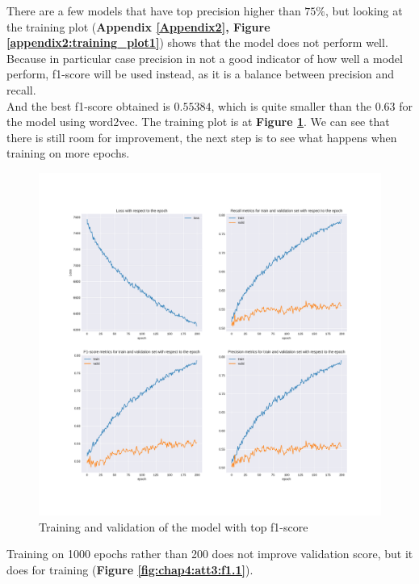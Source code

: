 There are a few models that have top precision higher than $75\%$, but looking at the training plot (\textbf{Appendix \ref{Appendix2}, Figure \ref{appendix2:training_plot1}}) shows that the model does not perform well. Because in particular case precision in not a good indicator of how well a model perform, f1-score will be used instead, as it is a balance between precision and recall. \\
And the best f1-score obtained is $0.55384$, which is quite smaller than the $0.63$ for the model using word2vec. The training plot is at \textbf{Figure \ref{fig:chap4:att3:f1}}. We can see that there is still room for improvement, the next step is to see what happens when training on more epochs. \\

\begin{figure}
 \centering
 \includegraphics[width=\textwidth]{images/chapitre4/attention-f1}
 \caption{Training and validation of the model with top f1-score}
 \label{fig:chap4:att3:f1}
\end{figure}
Training on 1000 epochs rather than 200 does not improve validation score, but it does for training (\textbf{Figure \ref{fig:chap4:att3:f1.1}}). \\
